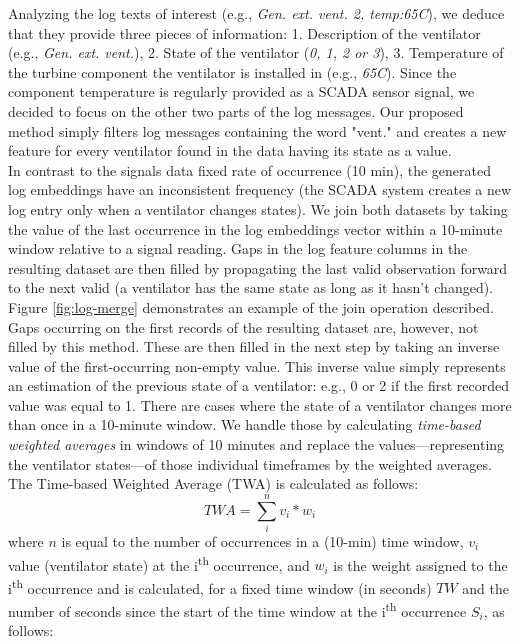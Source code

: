     Analyzing the log texts of interest (e.g., \emph{Gen. ext. vent. 2, temp:65\degree C}), we deduce that they provide three pieces of information: 
    1. Description of the ventilator (e.g., \emph{Gen. ext. vent.}), 2. State of the ventilator (\emph{0, 1, 2 or 3}), 
    3. Temperature of the turbine component the ventilator is installed in (e.g., \emph{65\degree C}).
    Since the component temperature is regularly provided as a SCADA sensor signal, we decided to focus on the other two parts of the log messages. 
    Our proposed method simply filters log messages containing the word "vent." and creates a new feature for every ventilator found in the data having its state as a value.\\
    In contrast to the signals data fixed rate of occurrence (10 min), the generated log embeddings have an inconsistent frequency (the SCADA system creates a new log entry only 
    when a ventilator changes states). We join both datasets by taking the value of the last occurrence in the log embeddings vector within a 10-minute window relative to a signal reading.
    Gaps in the log feature columns in the resulting dataset are then filled by propagating the last valid observation forward to the next valid (a ventilator has the same state as long as it hasn't changed).
    Figure \ref{fig:log-merge} demonstrates an example of the join operation described. Gaps occurring on the first records of the resulting dataset are, however, not filled by this 
    method. These are then filled in the next step by taking an inverse value of the first-occurring non-empty value. This inverse value simply represents an estimation of 
    the previous state of a ventilator: e.g., 0 or 2 if the first recorded value was equal to 1. There are cases where the state of 
    a ventilator changes more than once in a 10-minute window. We handle those by calculating \emph{time-based weighted averages} in windows of 10 minutes and replace 
    the values---representing the ventilator states---of those individual timeframes by the weighted averages. The Time-based Weighted Average (TWA) is calculated as follows:
    \begin{equation}
      TWA = \sum_{i}^{n} v_i * w_i
    \end{equation}
    where $n$ is equal to the number of occurrences in a (10-min) time window, $v_i$ value (ventilator state) at the i\textsuperscript{th} occurrence, 
    and $w_i$ is the weight assigned to the i\textsuperscript{th} occurrence and is calculated, for a fixed time window (in seconds) $TW$ and 
    the number of seconds since the start of the time window at the i\textsuperscript{th} occurrence $S_i$, as follows:

